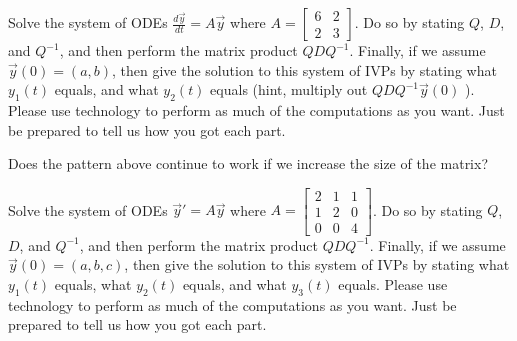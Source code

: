 \begin{problem}
 Solve the system of ODEs $\frac{d\vec y}{dt} = A\vec y$ where 
$A
=\begin{bmatrix}
  6&2\\2&3
 \end{bmatrix}
$. Do so by stating $Q$, $D$, and $Q^{-1}$, and then perform the matrix product $QDQ^{-1}$. Finally, if we assume $\vec y(0) = (a,b)$, then give the solution to this system of IVPs by stating what $y_1(t)$ equals, and what $y_2(t)$ equals (hint, multiply out $QDQ^{-1}\vec y(0)$  ).  Please use technology to perform as much of the computations as you want. Just be prepared to tell us how you got each part.
\end{problem}

Does the pattern above continue to work if we increase the size of the matrix?
\begin{problem*}[Optional]
 Solve the system of ODEs $\vec y '=A\vec y$ where 
$A
=\begin{bmatrix}
  2&1&1\\1&2&0\\0&0&4
 \end{bmatrix}
$. Do so by stating $Q$, $D$, and $Q^{-1}$, and then perform the matrix product $QDQ^{-1}$. Finally, if we assume $\vec y(0) = (a,b,c)$, then give the solution to this system of IVPs by stating what $y_1(t)$ equals, what $y_2(t)$ equals, and what $y_3(t)$ equals. Please use technology to perform as much of the computations as you want. Just be prepared to tell us how you got each part.
\end{problem*}

